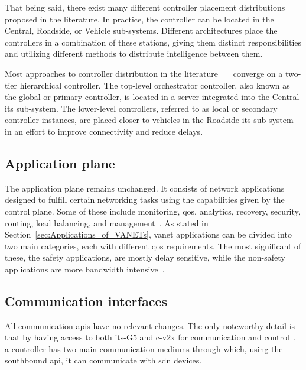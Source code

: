 That being said, there exist many different controller placement distributions proposed in the literature. In practice, the controller can be located in the Central, Roadside, or Vehicle sub-systems. Different architectures place the controllers in a combination of these stations, giving them distinct responsibilities and utilizing different methods to distribute intelligence between them.

Most approaches to controller distribution in the literature~\cite{bhatia_software_2019}~\cite{cardona_software-defined_2020}~\cite{toufga_openflow_2018} converge on a two-tier hierarchical controller. The top-level orchestrator controller, also known as the global or primary controller, is located in a server integrated into the Central \gls{its} sub-system. The lower-level controllers, referred to as local or secondary controller instances, are placed closer to vehicles in the Roadside \gls{its} sub-system in an effort to improve connectivity and reduce delays. 

\subsection{Application plane}

The application plane remains unchanged. It consists of network applications designed to fulfill certain networking tasks using the capabilities given by the control plane. Some of these include monitoring, \gls{qos}, analytics, recovery, security, routing, load balancing, and management~\cite{bhatia_software_2019}. As stated in Section~\ref{sec:Applications_of_VANETs}, \gls{vanet} applications can be divided into two main categories, each with different \gls{qos} requirements. The most significant of these, the safety applications, are mostly delay sensitive, while the non-safety applications are more bandwidth intensive~\cite{smida_efficient_2020}. 


\subsection{Communication interfaces}

All communication \glspl{api} have no relevant changes. The only noteworthy detail is that  by having access to both \gls{its}-G5 and \gls{c-v2x} for communication and control~\cite{toufga_openflow_2018}, a controller has two main communication mediums through which, using the southbound \gls{api}, it can communicate with \gls{sdn} devices. 

